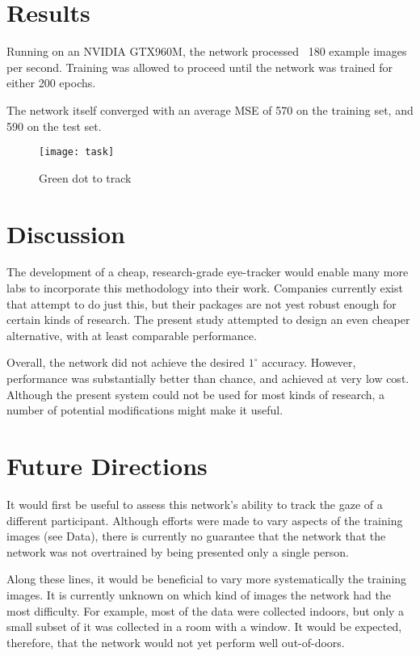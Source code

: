 \documentclass[10pt,letterpaper]{article}
\begin{document}
\section{Results}

Running on an NVIDIA GTX960M, the network processed ~180 example images per second. Training was allowed to proceed until the network was trained for either 200 epochs.

The network itself converged with an average MSE of 570 on the training set, and 590 on the test set. 


\begin{figure}[t]
\texttt{[image: task]}
\caption{Green dot to track} 
\label{task}
\centering
\end{figure}


\section{Discussion}

The development of a cheap, research-grade eye-tracker would enable many more labs to incorporate this methodology into their work. Companies currently exist that attempt to do just this, but their packages are not yest robust enough for certain kinds of research. The present study attempted to design an even cheaper alternative, with at least comparable performance.

Overall, the network did not achieve the desired $1^{\circ}$ accuracy. However, performance was substantially better than chance, and achieved at very low cost. Although the present system could not be used for most kinds of research, a number of potential modifications might make it useful. 

\section{Future Directions}

It would first be useful to assess this network's ability to track the gaze of a different participant. Although efforts were made to vary aspects of the training images (see Data), there is currently no guarantee that the network that the network was not overtrained by being presented only a single person.

Along these lines, it would be beneficial to vary more systematically the training images. It is currently unknown on which kind of images the network had the most difficulty. For example, most of the data were collected indoors, but only a small subset of it was collected in a room with a window. It would be expected, therefore, that the network would not yet perform well out-of-doors.
\end{document}
